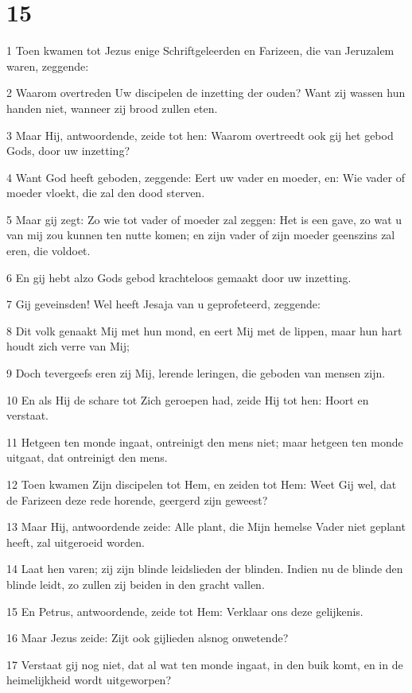 \chapter{15}

\par 1 Toen kwamen tot Jezus enige Schriftgeleerden en Farizeen, die van Jeruzalem waren, zeggende:
\par 2 Waarom overtreden Uw discipelen de inzetting der ouden? Want zij wassen hun handen niet, wanneer zij brood zullen eten.
\par 3 Maar Hij, antwoordende, zeide tot hen: Waarom overtreedt ook gij het gebod Gods, door uw inzetting?
\par 4 Want God heeft geboden, zeggende: Eert uw vader en moeder, en: Wie vader of moeder vloekt, die zal den dood sterven.
\par 5 Maar gij zegt: Zo wie tot vader of moeder zal zeggen: Het is een gave, zo wat u van mij zou kunnen ten nutte komen; en zijn vader of zijn moeder geenszins zal eren, die voldoet.
\par 6 En gij hebt alzo Gods gebod krachteloos gemaakt door uw inzetting.
\par 7 Gij geveinsden! Wel heeft Jesaja van u geprofeteerd, zeggende:
\par 8 Dit volk genaakt Mij met hun mond, en eert Mij met de lippen, maar hun hart houdt zich verre van Mij;
\par 9 Doch tevergeefs eren zij Mij, lerende leringen, die geboden van mensen zijn.
\par 10 En als Hij de schare tot Zich geroepen had, zeide Hij tot hen: Hoort en verstaat.
\par 11 Hetgeen ten monde ingaat, ontreinigt den mens niet; maar hetgeen ten monde uitgaat, dat ontreinigt den mens.
\par 12 Toen kwamen Zijn discipelen tot Hem, en zeiden tot Hem: Weet Gij wel, dat de Farizeen deze rede horende, geergerd zijn geweest?
\par 13 Maar Hij, antwoordende zeide: Alle plant, die Mijn hemelse Vader niet geplant heeft, zal uitgeroeid worden.
\par 14 Laat hen varen; zij zijn blinde leidslieden der blinden. Indien nu de blinde den blinde leidt, zo zullen zij beiden in den gracht vallen.
\par 15 En Petrus, antwoordende, zeide tot Hem: Verklaar ons deze gelijkenis.
\par 16 Maar Jezus zeide: Zijt ook gijlieden alsnog onwetende?
\par 17 Verstaat gij nog niet, dat al wat ten monde ingaat, in den buik komt, en in de heimelijkheid wordt uitgeworpen?

